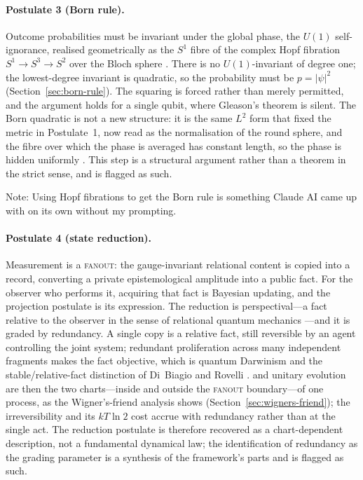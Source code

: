 \documentclass{article}
\begin{document}
\paragraph{Postulate 3 (Born rule).}
Outcome probabilities must be invariant under the global phase, the $U(1)$
self-ignorance, realised geometrically as the $S^{1}$ fibre of the complex Hopf
fibration $S^{1}\to S^{3}\to S^{2}$ over the Bloch sphere
\autocite{Hopf1931, Urbantke2003}. There is no $U(1)$-invariant of degree one; the
lowest-degree invariant is quadratic, so the probability must be
$p=\lvert\psi\rvert^{2}$ (Section~\ref{sec:born-rule}). The squaring is forced
rather than merely permitted, and the argument holds for a single qubit, where
Gleason's theorem is silent. The Born quadratic is not a new structure: it is the
same $L^{2}$ form that fixed the metric in Postulate~1, now read as the
normalisation of the round sphere, and the fibre over which the phase is averaged
has constant length, so the phase is hidden uniformly
\autocite{GluckWarnerZiller1986}. This step is a structural argument rather than a
theorem in the strict sense, and is flagged as such.

Note: Using Hopf fibrations to get the Born rule is something Claude AI came up with on its own without my prompting. 

\paragraph{Postulate 4 (state reduction).}
Measurement is a \textsc{fanout}: the gauge-invariant relational content is copied
into a record, converting a private epistemological amplitude into a public
fact. For the observer who performs it, acquiring that fact is Bayesian updating,
and the projection postulate is its expression. The reduction is perspectival---a
fact relative to the observer in the sense of relational quantum mechanics
\autocite{Rovelli1996a}---and it is graded by redundancy. A single copy is a
relative fact, still reversible by an agent controlling the joint system; redundant
proliferation across many independent fragments makes the fact objective, which is
quantum Darwinism \autocite{zurek_2009} and the stable/relative-fact distinction of
Di~Biagio and Rovelli \autocite{DiBiagioRovelli2021}.  and unitary
evolution are then the two charts---inside and outside the \textsc{fanout}
boundary---of one process, as the Wigner's-friend analysis shows
(Section~\ref{sec:wigners-friend}); the irreversibility and its $kT\ln 2$ cost
\autocite{Landauer_1961, wigner_1961} accrue with redundancy rather than at the
single act. The reduction postulate is therefore recovered as a chart-dependent
description, not a fundamental dynamical law; the identification of redundancy as
the grading parameter is a synthesis of the framework's parts and is flagged as
such.
\end{document}
